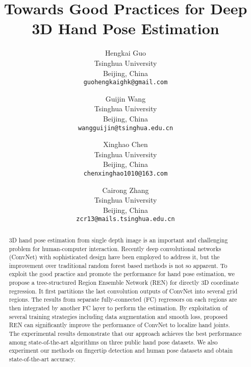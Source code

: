 \documentclass[10pt,twocolumn,letterpaper]{article}
\begin{document}
\title{Towards Good Practices for Deep 3D Hand Pose Estimation}

\author{Hengkai Guo\\
Tsinghua University\\
Beijing, China\\
{\tt\small guohengkaighk@gmail.com}
\and
Guijin Wang\\
Tsinghua University\\
Beijing, China\\
{\tt\small wangguijin@tsinghua.edu.cn}
\and
Xinghao Chen\\
Tsinghua University\\
Beijing, China\\
{\tt\small chenxinghao1010@163.com}
\and
Cairong Zhang\\
Tsinghua University\\
Beijing, China\\
{\tt\small zcr13@mails.tsinghua.edu.cn}
}

\maketitle


\begin{abstract}
3D hand pose estimation from single depth image is an important and challenging problem for human-computer interaction. Recently deep convolutional networks (ConvNet) with sophisticated design have been employed to address it, but the improvement over traditional random forest based methods is not so apparent. To exploit the good practice and promote the performance for hand pose estimation, we propose a tree-structured Region Ensemble Network (REN) for directly 3D coordinate regression. It first partitions the last convolution outputs of ConvNet into several grid regions. The results from separate fully-connected (FC) regressors on each regions are then integrated by another FC layer to perform the estimation. By exploitation of several training strategies including data augmentation and smooth  loss, proposed REN can significantly improve the performance of ConvNet to localize hand joints. The experimental results demonstrate that our approach achieves the best performance among state-of-the-art algorithms on three public hand pose datasets. We also experiment our methods on fingertip detection and human pose datasets and obtain state-of-the-art accuracy.
\end{abstract}
\end{document}
